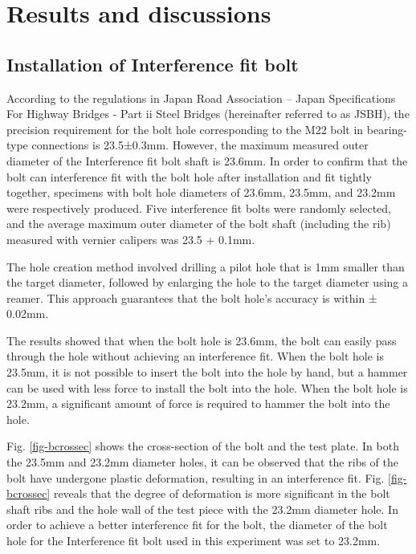 \section{Results and discussions}

\subsection{Installation of Interference fit bolt}

According to the regulations in Japan Road Association -- Japan Specifications For Highway Bridges - Part ii Steel Bridges\cite{douji2017} (hereinafter referred to as JSBH), the precision requirement for the bolt hole corresponding to the M22 bolt in bearing-type connections is 23.5±0.3mm. However, the maximum measured outer diameter of the Interference fit bolt shaft is 23.6mm. In order to confirm that the bolt can interference fit with the bolt hole after installation and fit tightly together, specimens with bolt hole diameters of 23.6mm, 23.5mm, and 23.2mm were respectively produced. Five interference fit bolts were randomly selected, and the average maximum  outer diameter of the bolt shaft (including the rib) measured with vernier calipers was 23.5 + 0.1mm.

The hole creation method involved drilling a pilot hole that is 1mm smaller than the target diameter, followed by enlarging the hole to the target diameter using a reamer. This approach guarantees that the bolt hole's accuracy is within ± 0.02mm.

The results showed that when the bolt hole is 23.6mm, the bolt can easily pass through the hole without achieving an interference fit. When the bolt hole is 23.5mm, it is not possible to insert the bolt into the hole by hand, but a hammer can be used with less force to install the bolt into the hole. When the bolt hole is 23.2mm, a significant amount of force is required to hammer the bolt into the hole.

Fig. \ref{fig-bcrossec} shows the cross-section of the bolt and the test plate. In both the 23.5mm and 23.2mm diameter holes, it can be observed that the ribs of the bolt have undergone plastic deformation, resulting in an interference fit. Fig. \ref{fig-bcrossec} reveals that the degree of deformation is more significant in the bolt shaft ribs and the hole wall of the test piece with the 23.2mm diameter hole. In order to achieve a better interference fit for the bolt, the diameter of the bolt hole for the Interference fit bolt used in this experiment was set to 23.2mm.


